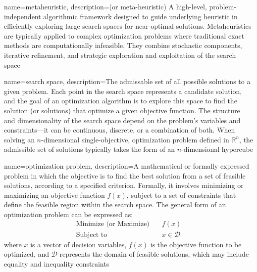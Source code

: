{
    name=metaheuristic,
    description={(or meta-heuristic) A high-level, problem-independent algorithmic framework designed to guide underlying heuristic in efficiently exploring large search spaces for near-optimal solutions. Metaheuristics are typically applied to complex optimization problems where traditional exact methods are computationally infeasible. They combine stochastic components, iterative refinement, and strategic exploration and exploitation of the search space}
}

{
    name=search space,
    description={The admissable set of all possible solutions to a given problem. Each point in the search space represents a candidate solution, and the goal of an optimization algorithm is to explore this space to find the solution (or solutions) that optimize a given objective function. The structure and dimensionality of the search space depend on the problem's variables and constraints---it can be continuous, discrete, or a combination of both. When solving an $n$-dimensional single-objective, optimization problem defined in $\mathbb{R}^{n}$, the admissible set of solutions typically takes the form of an $n$-dimensional hypercube}
}

{
    name=optimization problem,
    description={A mathematical or formally expressed problem in which the objective is to find the best solution from a set of feasible solutions, according to a specified criterion. Formally, it involves minimizing or maximizing an objective function $f(x)$, subject to a set of constraints that define the feasible region within the search space. The general form of an optimization problem can be expressed as:%
$$
\begin{aligned}
\text{Minimize (or Maximize)} \quad & f(x) \\
\text{Subject to} \quad & x \in \mathcal{D}
\end{aligned}
$$
where $x$ is a vector of decision variables, $f(x)$ is the objective function to be optimized, and $\mathcal{D}$ represents the domain of feasible solutions, which may include equality and inequality constraints}
}
